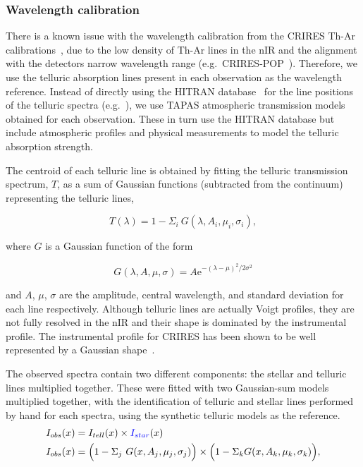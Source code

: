 \documentclass[fleqn,usenatbib]{mnras}
\newcommand*\bl{\color{blue}}
\begin{document}
\subsubsection{Wavelength calibration}
\label{subsec:wave_cal}
There is a known issue with the wavelength calibration from the CRIRES Th-Ar calibrations~\citep{kerber_laboratory_2009}, due to the low density of Th-Ar lines in the nIR and the alignment with the detectors narrow wavelength range (e.g.\ CRIRES-POP~\citep{nicholls_crirespop_2017}).
Therefore, we use the telluric absorption lines present in each observation as the wavelength reference. Instead of directly using the HITRAN database~\citep{rothman_hitran2012_2013} for the line positions of the telluric spectra (e.g.~\citep{brogi_signature_2012,brogi_carbon_2014,dekok_detection_2013}), we use TAPAS atmospheric transmission models~\citep{bertaux_tapas_2014} obtained for each observation. These in turn use the HITRAN database but include atmospheric profiles and physical measurements to model the telluric absorption strength.

The centroid of each telluric line is obtained by fitting the telluric transmission spectrum, \(T\), as a sum of Gaussian functions (subtracted from the continuum) representing the telluric lines,

\begin{equation}
T(\lambda) = 1 - {\Sigma}_{i}\ G(\lambda, A_{i}, {\mu}_{i}, {\sigma}_{i}),
\end{equation}

where \(G\) is a Gaussian function of the form

\begin{equation}
G(\lambda, A, \mu, \sigma) = {A \textrm{e}}^{{-(\lambda-\mu)}^{2}/2\sigma^{2}}
\end{equation}

and \(A\), \(\mu\), \(\sigma\) are the amplitude, central wavelength, and standard deviation for each line respectively. {Although telluric lines are actually Voigt profiles, they are not fully resolved in the nIR and their shape is dominated by the instrumental profile. The instrumental profile for CRIRES has been shown to be well represented by a Gaussian shape~\citep{seifahrt_synthesising_2010}.}

The observed spectra contain two different components: the stellar and telluric lines multiplied together. These were fitted with two Gaussian-sum models multiplied together, with the identification of telluric and stellar lines performed {by hand} for each spectra, using the synthetic telluric models as the reference.
\begin{align}
I_{obs}(x) &= I_{tell}(x) \times {\bl I_{star}}(x) \nonumber \\
I_{obs}(x) &= \Big(1 - {\Sigma}_{j}\ G(x, A_{j}, {\mu}_{j}, {\sigma}_{j})\Big) \times \Big(1 - {\Sigma}_{k} G(x, A_{k}, {\mu}_{k}, {\sigma}_{k})\Big), \label{eqn:obs}
\end{align}
\end{document}
